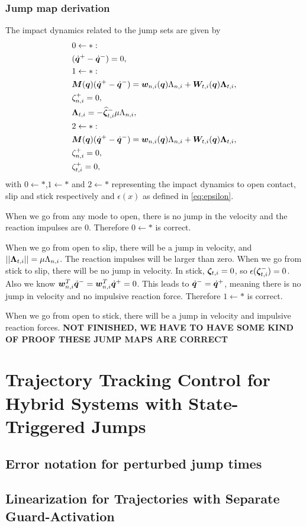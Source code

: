 \documentclass[DC2017114Bouma.tex]{subfiles}
\begin{document}
\subsection{Jump map derivation}\label{app:jumpmaps}
The impact dynamics related to the jump sets are given by
\begin{align}
&0\leftarrow \ast:\nonumber\\
&(\dot{{\boldsymbol{q}}}^+ - \dot{{\boldsymbol{q}}}^-) = 0,\label{eq:appjump1}\\
&1\leftarrow\ast:\nonumber\\
&{\boldsymbol{M}}({\boldsymbol{q}})(\dot{{\boldsymbol{q}}}^+ - \dot{{\boldsymbol{q}}}^-) = {\boldsymbol{w}}_{n,i}({\boldsymbol{q}})\Lambda_{n,i} + {\boldsymbol{W}}_{t,i}({\boldsymbol{q}})\boldsymbol{\Lambda}_{t,i},\label{eq:appjump2}\\
&\zeta_{n,i}^+=0,\label{eq:appjump3}\\
&\boldsymbol{\Lambda}_{t,i} = -\widehat{\boldsymbol{\zeta}}^-_{t,i}\mu\Lambda_{n,i},\label{eq:appjump4}\\
&2\leftarrow \ast:\nonumber\\
&{\boldsymbol{M}}({\boldsymbol{q}})(\dot{{\boldsymbol{q}}}^+ - \dot{{\boldsymbol{q}}}^-) = {\boldsymbol{w}}_{n,i}({\boldsymbol{q}})\Lambda_{n,i} + {\boldsymbol{W}}_{t,i}({\boldsymbol{q}})\boldsymbol{\Lambda}_{t,i},\label{eq:appjump5}\\
&\zeta_{n,i}^+=0,\label{eq:appjump6}\\
&\zeta_{t,i}^+= 0,\label{eq:appjump7}
\end{align}
with $0\leftarrow\ast$,$1\leftarrow\ast$ and $2\leftarrow\ast$ representing the impact dynamics to open contact, slip and stick respectively and $\epsilon(x)$ as defined in \eqref{eq:epsilon}. 

When we go from any mode to open, there is no jump in the velocity and the reaction impulses are 0. Therefore $0\leftarrow \ast$ is correct.

When we go from open to slip, there will be a jump in velocity, and $||\boldsymbol{\Lambda}_{t,i}|| = \mu\Lambda_{n,i}$. The reaction impulses will be larger than zero. When we go from stick to slip, there will be no jump in velocity. In stick, $\boldsymbol{\zeta}_{t,i} =0$, so $\epsilon(\boldsymbol{\zeta}^-_{t,i}) = 0$. Also we know ${\boldsymbol{w}}_{n,i}^T\dot{{\boldsymbol{q}}}^- = {\boldsymbol{w}}_{n,i}^T\dot{{\boldsymbol{q}}}^+ = 0 $. This leads to $\dot{{\boldsymbol{q}}}^- = \dot{{\boldsymbol{q}}}^+$, meaning there is no jump in velocity and no impulsive reaction force. Therefore $1\leftarrow \ast$ is correct.

When we go from open to stick, there will be a jump in velocity and impulsive reaction forces.
\textbf{NOT FINISHED, WE HAVE TO HAVE SOME KIND OF PROOF THESE JUMP MAPS ARE CORRECT}

\cleartooddpage
\chapter{Trajectory Tracking Control for Hybrid Systems with State-Triggered Jumps}
\cite{Rijnen2017}
\section{Error notation for perturbed jump times}
\section{Linearization for Trajectories with Separate Guard-Activation}
\end{document}
